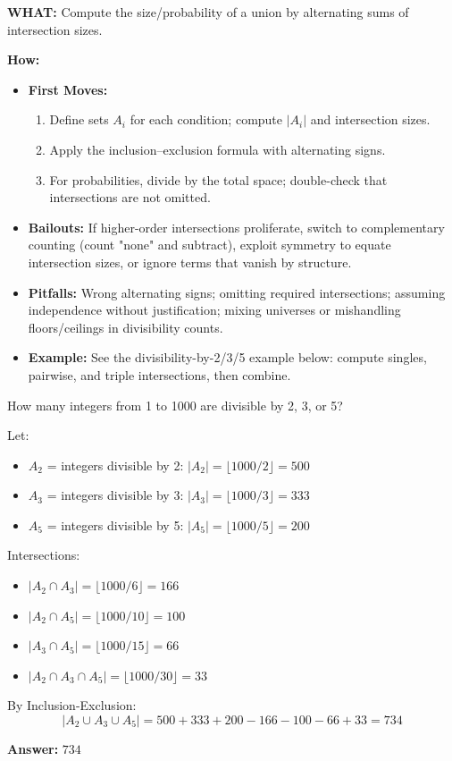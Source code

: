 \documentclass[12pt]{article}
\newenvironment{problem}[1]
{\begin{tcolorbox}[colback=blue!5!white,colframe=blue!75!black,title={#1}]}{\end{tcolorbox}}
\newenvironment{solution}
{\begin{tcolorbox}[colback=green!5!white,colframe=green!75!black,title={Solution}]}{\end{tcolorbox}}
\begin{document}
\textbf{WHAT:} Compute the size/probability of a union by alternating sums of intersection sizes.


\textbf{How:}
\begin{itemize}
    \item \textbf{First Moves:}
    \begin{enumerate}[nosep]
        \item Define sets $A_i$ for each condition; compute $|A_i|$ and intersection sizes.
        \item Apply the inclusion--exclusion formula with alternating signs.
        \item For probabilities, divide by the total space; double-check that intersections are not omitted.
    \end{enumerate}
    \item \textbf{Bailouts:} If higher-order intersections proliferate, switch to complementary counting (count "none" and subtract), exploit symmetry to equate intersection sizes, or ignore terms that vanish by structure.
    \item \textbf{Pitfalls:} Wrong alternating signs; omitting required intersections; assuming independence without justification; mixing universes or mishandling floors/ceilings in divisibility counts.
    \item \textbf{Example:} See the divisibility-by-2/3/5 example below: compute singles, pairwise, and triple intersections, then combine.
\end{itemize}

\begin{problem}{Example: Divisibility Count}
How many integers from 1 to 1000 are divisible by 2, 3, or 5?
\end{problem}

\begin{solution}
Let:
\begin{itemize}
    \item $A_2$ = integers divisible by 2: $|A_2| = \lfloor 1000/2 \rfloor = 500$
    \item $A_3$ = integers divisible by 3: $|A_3| = \lfloor 1000/3 \rfloor = 333$
    \item $A_5$ = integers divisible by 5: $|A_5| = \lfloor 1000/5 \rfloor = 200$
\end{itemize}

Intersections:
\begin{itemize}
    \item $|A_2 \cap A_3| = \lfloor 1000/6 \rfloor = 166$
    \item $|A_2 \cap A_5| = \lfloor 1000/10 \rfloor = 100$
    \item $|A_3 \cap A_5| = \lfloor 1000/15 \rfloor = 66$
    \item $|A_2 \cap A_3 \cap A_5| = \lfloor 1000/30 \rfloor = 33$
\end{itemize}

By Inclusion-Exclusion:
$$|A_2 \cup A_3 \cup A_5| = 500 + 333 + 200 - 166 - 100 - 66 + 33 = 734$$

\textbf{Answer:} $734$
\end{solution}
\end{document}
